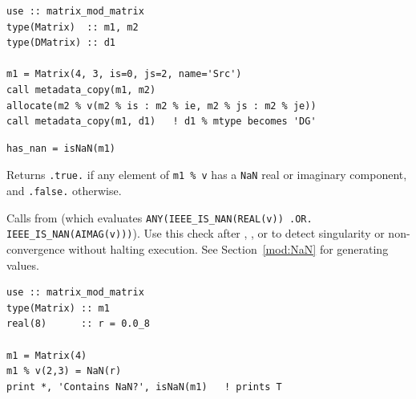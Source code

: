 \begin{description}[leftmargin=2.2cm, style=nextline]
\end{description}

\lstset{language=[95]Fortran}
\begin{lstlisting}
use :: matrix_mod_matrix
type(Matrix)  :: m1, m2
type(DMatrix) :: d1

m1 = Matrix(4, 3, is=0, js=2, name='Src')
call metadata_copy(m1, m2)
allocate(m2 % v(m2 % is : m2 % ie, m2 % js : m2 % je))
call metadata_copy(m1, d1)   ! d1 % mtype becomes 'DG'
\end{lstlisting}


\lstset{language=[95]Fortran}
\begin{lstlisting}
has_nan = isNaN(m1)
\end{lstlisting}

Returns \texttt{.true.} if any element of \texttt{m1 \% v} has a \texttt{NaN} real or imaginary component, and \texttt{.false.} otherwise.

Calls  from  (which evaluates \texttt{ANY(IEEE\_IS\_NAN(REAL(v)) .OR. IEEE\_IS\_NAN(AIMAG(v)))}). Use this check after , , or  to detect singularity or non-convergence without halting execution. See Section~\ref{mod:NaN} for generating  values.

\begin{description}[leftmargin=2.2cm, style=nextline]
\end{description}

\lstset{language=[95]Fortran}
\begin{lstlisting}
use :: matrix_mod_matrix
type(Matrix) :: m1
real(8)      :: r = 0.0_8

m1 = Matrix(4)
m1 % v(2,3) = NaN(r)
print *, 'Contains NaN?', isNaN(m1)   ! prints T
\end{lstlisting}
